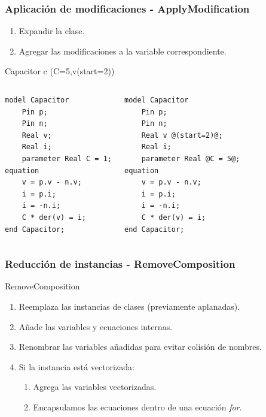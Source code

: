 \begin{frame}[fragile]
\frametitle{Aplicación de modificaciones - ApplyModification} 
\begin{block}{}
\begin{enumerate}
\item Expandir la clase.
\item Agregar las modificaciones a la variable correspondiente.
\end{enumerate}
\end{block}
\pause
Capacitor c (C=5,v(start=2))

\begin{columns} 
\begin{lstlisting}[style=base,basicstyle=\scriptsize]
model Capacitor 
    Pin p;
    Pin n;
    Real v;
    Real i;
    parameter Real C = 1;
equation
    v = p.v - n.v;
    i = p.i;
    i = -n.i;
    C * der(v) = i;
end Capacitor;
\end{lstlisting}
\pause
{}  
\begin{lstlisting}[style=base,basicstyle=\scriptsize]
model Capacitor 
    Pin p;
    Pin n;
    Real v @(start=2)@;
    Real i;
    parameter Real @C = 5@;
equation
    v = p.v - n.v;
    i = p.i;
    i = -n.i;
    C * der(v) = i;
end Capacitor;
\end{lstlisting}
\end{columns}
\end{frame}

\begin{frame}[fragile]
\frametitle{Reducción de instancias - RemoveComposition} 
\begin{block}{RemoveComposition}
\begin{enumerate}
\item Reemplaza las instancias de clases (previamente aplanadas).
\item Añade las variables y ecuaciones internas.
\item Renombrar las variables añadidas para evitar colisión de nombres.
\item Si la instancia está vectorizada: 
    \begin{enumerate}
    \item Agrega las variables vectorizadas.
    \item Encapsulamos las ecuaciones dentro de una ecuación \textit{for}.
    \end{enumerate} 
\end{enumerate}
\end{block}
\end{frame}

